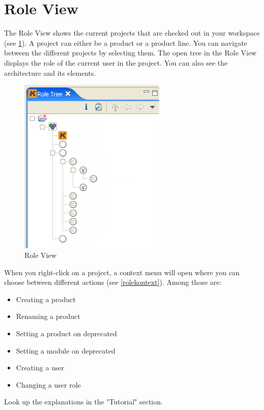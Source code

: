 \section{Role View}

The Role View shows the current projects that are checked out in your workspace 
(see \ref{roletree}).
A project can either be a product or a product line. You can navigate between the 
different projects by selecting them. The open tree in the Role View displays the
role of the current user in the project. You can also see the architecture and its 
elements.

\begin{figure}[h!]
\begin{center}
\includegraphics[width=7cm]{roletree.png}
   \caption{Role View}
\label{roletree}
\end{center}
\end{figure}\par

When you right-click on a project, a context menu will open where you can choose 
between different actions (see \ref{rolekontext}). Among those are:

\begin{itemize}
	\item Creating a product
	\item Renaming a product
	\item Setting a product on deprecated
	\item Setting a module on deprecated
	\item Creating a user
	\item Changing a user role
\end{itemize}
Look up the explanations in the "Tutorial" section.

